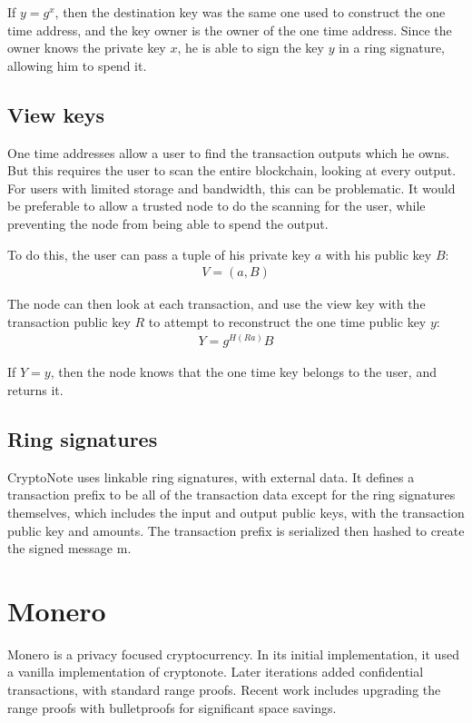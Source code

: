 \documentclass{article}
\begin{document}
If $y = g^x$, then the destination key was the same one used to construct the one time address, and the key owner is the owner of the one time address.  Since the owner knows the private key $x$, he is able to sign the key $y$ in a ring signature, allowing him to spend it.


\subsection{View keys}

One time addresses allow a user to find the transaction outputs which he owns.  But this requires the user to scan the entire blockchain, looking at every output.  For users with limited storage and bandwidth, this can be problematic.  It would be preferable to allow a trusted node to do the scanning for the user, while preventing the node from being able to spend the output.

To do this, the user can pass a tuple of his private key $a$ with his public key $B$:
\begin{eqnarray}
  V = (a, B)
\end{eqnarray}

The node can then look at each transaction, and use the view key with the transaction public key $R$ to attempt to reconstruct the one time public key $y$:
\begin{eqnarray}
  Y = g^{H(Ra)} B
\end{eqnarray}

If $Y = y$, then the node knows that the one time key belongs to the user, and returns it.


\subsection{Ring signatures}

CryptoNote uses linkable ring signatures, with external data.  It defines a transaction prefix to be all of the transaction data except for the ring signatures themselves, which includes the input and output public keys, with the transaction public key and amounts.  The transaction prefix is serialized then hashed to create the signed message m.



\section{Monero}

Monero is a privacy focused cryptocurrency.  In its initial implementation, it used a vanilla implementation of cryptonote.  Later iterations added confidential transactions, with standard range proofs.  Recent work includes upgrading the range proofs with bulletproofs for significant space savings.
\end{document}
